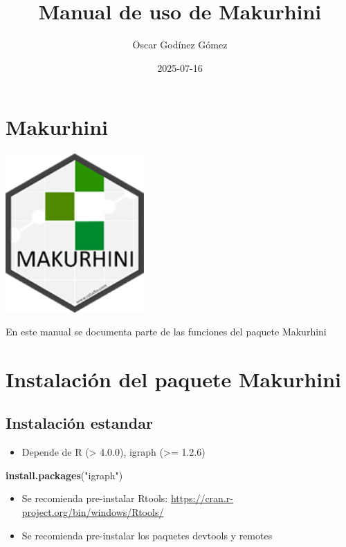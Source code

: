 \documentclass[
]{book}
\title{Manual de uso de Makurhini}
\author{Oscar Godínez Gómez}
\date{2025-07-16}
\newenvironment{Shaded}{\begin{snugshade}}{\end{snugshade}}
\newcommand{\FunctionTok}[1]{\textcolor[rgb]{0.13,0.29,0.53}{\textbf{#1}}}
\newcommand{\NormalTok}[1]{#1}
\newcommand{\StringTok}[1]{\textcolor[rgb]{0.31,0.60,0.02}{#1}}
\providecommand{\tightlist}{%
  \setlength{\itemsep}{0pt}\setlength{\parskip}{0pt}}
\begin{document}
\maketitle

{
\setcounter{tocdepth}{1}
\tableofcontents
}
\chapter*{Makurhini}\label{makurhini}

\includegraphics[width=2.08333in,height=\textheight,keepaspectratio]{LOGO_MAKHURINI.png}

En este manual se documenta parte de las funciones del paquete Makurhini

\chapter{Instalación del paquete Makurhini}\label{instalaciuxf3n-del-paquete-makurhini}

\section{Instalación estandar}\label{instalaciuxf3n-estandar}

\begin{itemize}
\tightlist
\item
  Depende de R (\textgreater{} 4.0.0), igraph (\textgreater= 1.2.6)
\end{itemize}

\begin{Shaded}
\begin{Highlighting}[]
\FunctionTok{install.packages}\NormalTok{(}\StringTok{"igraph"}\NormalTok{)}
\end{Highlighting}
\end{Shaded}

\begin{itemize}
\item
  Se recomienda pre-instalar Rtools:
  \url{https://cran.r-project.org/bin/windows/Rtools/}
\item
  Se recomienda pre-instalar los paquetes devtools y remotes
\end{itemize}
\end{document}
